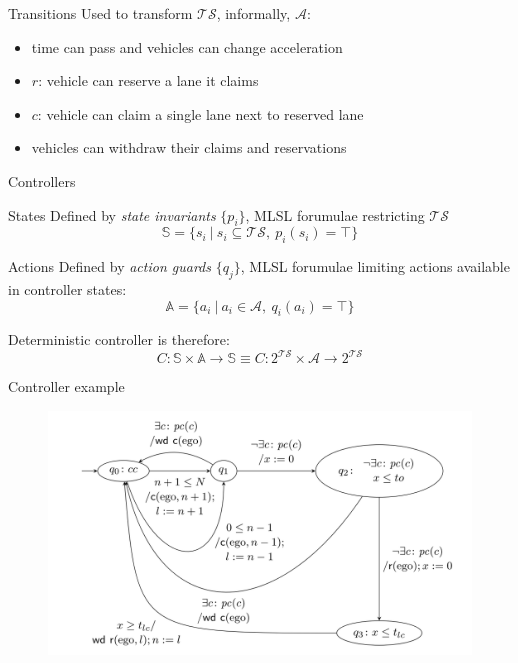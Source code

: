 \documentclass[xcolor=table]{beamer}
\begin{document}
\begin{frame}{Transitions}
Used to transform $\mathcal{TS}$, informally, $\mathcal{A}$:
\begin{itemize}
	\item time can pass and vehicles can change acceleration
	\item $r$: vehicle can reserve a lane it claims
	\item $c$: vehicle can claim a single lane next to reserved lane
	\item vehicles can withdraw their claims and reservations
\end{itemize}

\end{frame}

\begin{frame}{Controllers}
\begin{block}{States}
	Defined by \textit{state invariants} $\{p_i\}$, MLSL forumulae restricting $\mathcal{TS}$\\
	$$\mathbb{S} = \{s_i\ |\ s_i \subseteq \mathcal{TS},\ p_i(s_i) = \top \}$$
\end{block}
\pause
\begin{block}{Actions}
	Defined by \textit{action guards} $\{q_j\}$, MLSL forumulae limiting actions available in controller states:
	$$\mathbb{A} = \{a_i\ |\ a_i \in \mathcal{A},\ q_i(a_i) = \top \}$$
\end{block}
\pause
Deterministic controller is therefore:
$$C : \mathbb{S} \times \mathbb{A} \to \mathbb{S} \equiv C:2^\mathcal{TS} \times \mathcal{A} \to 2^\mathcal{TS}$$
\end{frame}

\begin{frame}{Controller example}
\begin{figure}[h]
	\centering
	\includegraphics[width=1.0 \textwidth]{../figs/controller.png}
\end{figure}
\end{frame}
\end{document}

